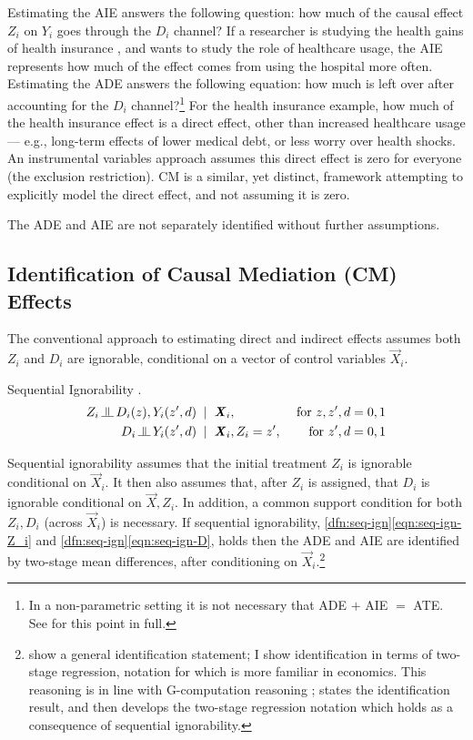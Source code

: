 Estimating the AIE answers the following question: how much of the causal effect $Z_i$ on $Y_i$ goes through the $D_i$ channel?
If a researcher is studying the health gains of health insurance \citep{finkelstein2008oregon}, and wants to study the role of healthcare usage, the AIE represents how much of the effect comes from using the hospital more often.
Estimating the ADE answers the following equation: how much is left over after accounting for the $D_i$ channel?\footnote{
    In a non-parametric setting it is not necessary that ADE $+$ AIE $=$ ATE.
    See \cite{imai2010identification} for this point in full.
}
For the health insurance example, how much of the health insurance effect is a direct effect, other than increased healthcare usage --- e.g., long-term effects of lower medical debt, or less worry over health shocks.
An instrumental variables approach assumes this direct effect is zero for everyone (the exclusion restriction).
CM is a similar, yet distinct, framework attempting to explicitly model the direct effect, and not assuming it is zero.

The ADE and AIE are not separately identified without further assumptions.

\subsection{Identification of Causal Mediation (CM) Effects}
The conventional approach to estimating direct and indirect effects assumes both $Z_i$ and $D_i$ are ignorable, conditional on a vector of control variables $\vec X_i$.
\begin{definition}
    \label{dfn:seq-ign}
    Sequential Ignorability \citep{imai2010identification}.
    \begin{align}
        \label{eqn:seq-ign-Z_i}
        Z_i \indep  D_i(z), Y_i(z', d) \;\; &| \;\; \vec X_i,
            &\textnormal{ for } z, z', d = 0, 1 \\
        \label{eqn:seq-ign-D}
        D_i \indep Y_i(z', d) \;\; &| \;\; \vec X_i, Z_i = z', 
            &\textnormal{ for } z', d = 0, 1
    \end{align}
\end{definition}
Sequential ignorability assumes that the initial treatment $Z_i$ is ignorable conditional on $\vec X_i$.
It then also assumes that, after $Z_i$ is assigned, that $D_i$ is ignorable conditional on $\vec X, Z_i$.
In addition, a common support condition for both $Z_i, D_i$ (across $\vec X_i$) is necessary.
If sequential ignorability, \ref{dfn:seq-ign}\eqref{eqn:seq-ign-Z_i} and \ref{dfn:seq-ign}\eqref{eqn:seq-ign-D}, holds then the ADE and AIE are identified by two-stage mean differences, after conditioning on $\vec X_i$.\footnote{
    \cite{imai2010identification} show a general identification statement; I show identification in terms of two-stage regression, notation for which is more familiar in economics.
    This reasoning is in line with G-computation reasoning \citep{robins1986g};
     states the \cite{imai2010identification} identification result, and then develops the two-stage regression notation which holds as a consequence of sequential ignorability.
}
\vspace{0.1cm}

